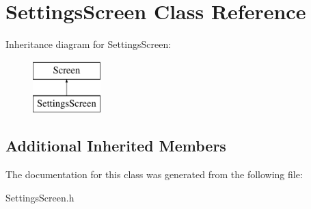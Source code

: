 \hypertarget{class_settings_screen}{}\section{Settings\+Screen Class Reference}
\label{class_settings_screen}
Inheritance diagram for Settings\+Screen\+:\begin{figure}[H]
\begin{center}
\leavevmode
\includegraphics[height=2.000000cm]{class_settings_screen}
\end{center}
\end{figure}
\subsection*{Additional Inherited Members}


The documentation for this class was generated from the following file\+:\begin{DoxyCompactItemize}
\item 
Settings\+Screen.\+h\end{DoxyCompactItemize}
